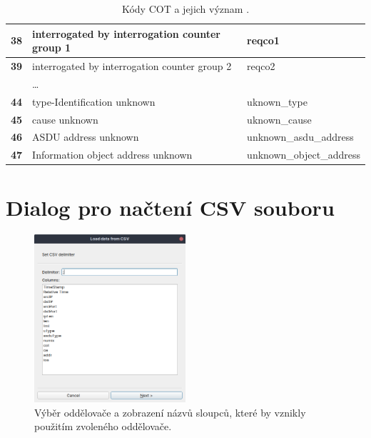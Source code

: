 \begin{table}[H]
\begin{tabularx}{\textwidth}{|c|X|l|}
\textbf{38} & interrogated by interrogation counter group 1         & reqco1 \\ \hline
\textbf{39} & interrogated by interrogation counter group 2         & reqco2 \\ \hline
  & \dots & \\ \hline
\textbf{44} & type-Identification unknown       & uknown\_type \\ \hline
\textbf{45} & cause unknown         & uknown\_cause \\ \hline
\textbf{46} & ASDU address unknown      & unknown\_asdu\_address \\ \hline
\textbf{47} & Information object address unknown & unknown\_object\_address \\ \hline
    \end{tabularx}
    \caption{Kódy COT a jejich význam \cite{iec_104}.}
    \label{cot_table}
\end{table}

\chapter{Dialog pro načtení CSV souboru}

\begin{figure}[H]
	\centering
    \includegraphics[width=0.5\textwidth]{obrazky-figures/load_csv_cols.png}
    \caption{Výběr oddělovače a zobrazení názvů sloupců, které by vznikly použitím zvoleného oddělovače.}
    \label{fig:delim_select_screen}
\end{figure}
    
